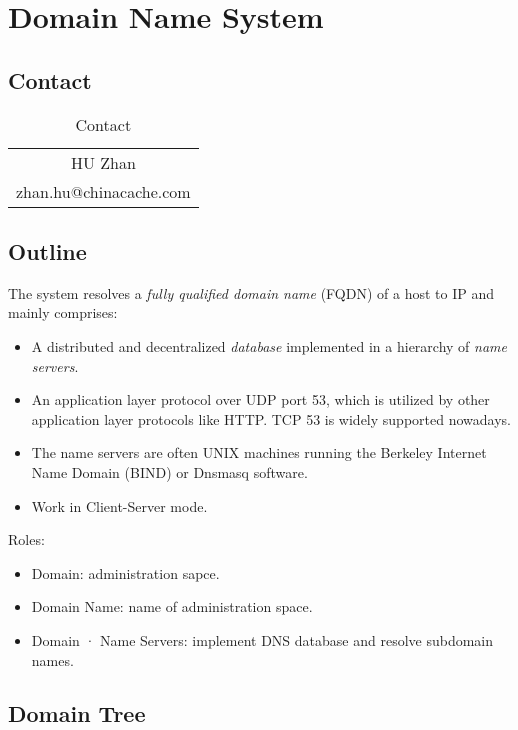 \chapter{Domain Name System}
\label{cha:domain-name-system}

\section{Contact}
\label{sec:dns-contact}

\begin{table}[!h]
  \centering
  \begin{tabular}[!h]{c}
    \toprule{}
    HU Zhan \\
    zhan.hu@chinacache.com \\
    \bottomrule
  \end{tabular}
  \caption{Contact}
\end{table}

\section{Outline}
\label{sec:dns-outline}

The system resolves a \textit{fully qualified domain name} (FQDN)
of a host to IP and mainly comprises:

\begin{itemize}
\item A distributed and decentralized \textit{database}
  implemented in a hierarchy of \textit{name servers}.
\item An application layer protocol over UDP port 53, which is
  utilized by other application layer protocols like HTTP. TCP 53
  is widely supported nowadays.
\item The name servers are often UNIX machines running the
  Berkeley Internet Name Domain (BIND) or Dnsmasq software.
\item Work in Client-Server mode.
\end{itemize}

Roles:

\begin{itemize}
\item Domain: administration sapce.
\item Domain Name: name of administration space.
\item Domain · Name Servers: implement DNS database and resolve subdomain names.
\end{itemize}

\section{Domain Tree}
\label{sec:domain-tree}

